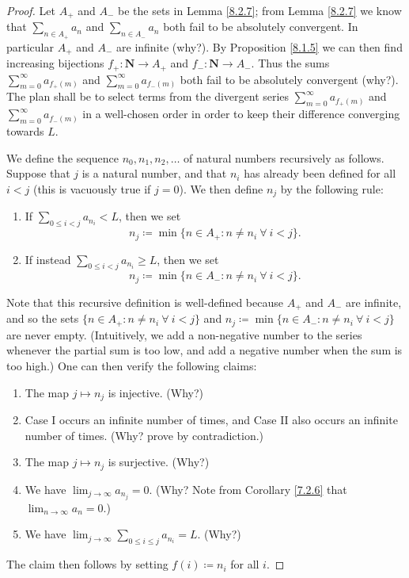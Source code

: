 \begin{proof}
    Let \(A_+\) and \(A_-\) be the sets in Lemma \ref{8.2.7};
    from Lemma \ref{8.2.7} we know that \(\sum_{n \in A_+} a_n\) and \(\sum_{n \in A_-} a_n\) both fail to be absolutely convergent.
    In particular \(A_+\) and \(A_-\) are infinite (why?).
    By Proposition \ref{8.1.5} we can then find increasing bijections \(f_+ : \mathbf{N} \to A_+\) and \(f_- : \mathbf{N} \to A_-\).
    Thus the sums \(\sum_{m = 0}^\infty a_{f_+(m)}\) and \(\sum_{m = 0}^\infty a_{f_-(m)}\) both fail to be absolutely convergent (why?).
    The plan shall be to select terms from the divergent series \(\sum_{m = 0}^\infty a_{f_+(m)}\) and \(\sum_{m = 0}^\infty a_{f_-(m)}\) in a well-chosen order in order to keep their difference converging towards \(L\).

    We define the sequence \(n_0, n_1, n_2, \dots\) of natural numbers recursively as follows.
    Suppose that \(j\) is a natural number, and that \(n_i\) has already been defined for all \(i < j\) (this is vacuously true if \(j = 0\)).
    We then define \(n_j\) by the following rule:
    \begin{enumerate}[label=(\Roman*)]
        \item If \(\sum_{0 \leq i < j} a_{n_i} < L\), then we set
              \[
                  n_j \coloneqq \min\{n \in A_+ : n \neq n_i \ \forall\ i < j\}.
              \]
        \item If instead \(\sum_{0 \leq i < j} a_{n_i} \geq L\), then we set
              \[
                  n_j \coloneqq \min\{n \in A_- : n \neq n_i \ \forall\ i < j\}.
              \]
    \end{enumerate}
    Note that this recursive definition is well-defined because \(A_+\) and \(A_-\) are infinite, and so the sets \(\{n \in A_+ : n \neq n_i \ \forall\ i < j\}\) and \(n_j \coloneqq \min\{n \in A_- : n \neq n_i \ \forall\ i < j\}\) are never empty.
    (Intuitively, we add a non-negative number to the series whenever the partial sum is too low, and add a negative number when the sum is too high.)
    One can then verify the following claims:
    \begin{enumerate}
        \item The map \(j \mapsto n_j\) is injective. (Why?)
        \item Case I occurs an infinite number of times, and Case II also occurs an infinite number of times. (Why? prove by contradiction.)
        \item The map \(j \mapsto n_j\) is surjective. (Why?)
        \item We have \(\lim_{j \to \infty} a_{n_j} = 0\). (Why? Note from Corollary \ref{7.2.6} that \(\lim_{n \to \infty} a_n = 0\).)
        \item We have \(\lim_{j \to \infty} \sum_{0 \leq i \leq j} a_{n_i} = L\). (Why?)
    \end{enumerate}
    The claim then follows by setting \(f(i) \coloneqq n_i\) for all \(i\).
\end{proof}

